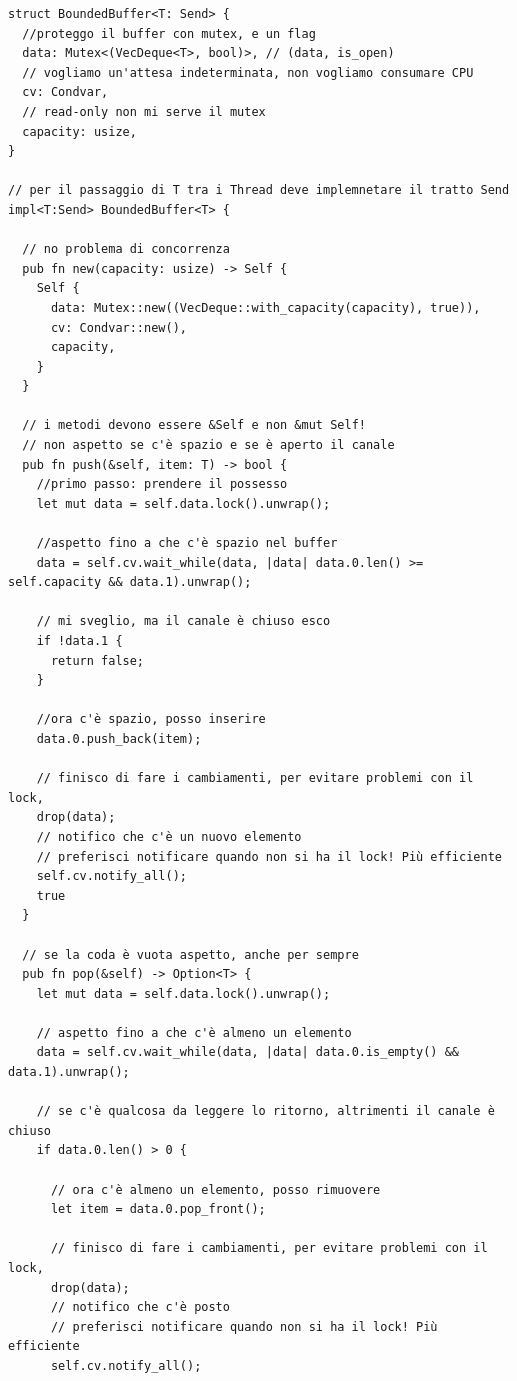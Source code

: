 \begin{verbatim}
struct BoundedBuffer<T: Send> {
  //proteggo il buffer con mutex, e un flag
  data: Mutex<(VecDeque<T>, bool)>, // (data, is_open)
  // vogliamo un'attesa indeterminata, non vogliamo consumare CPU
  cv: Condvar,
  // read-only non mi serve il mutex
  capacity: usize,
}

// per il passaggio di T tra i Thread deve implemnetare il tratto Send
impl<T:Send> BoundedBuffer<T> {

  // no problema di concorrenza
  pub fn new(capacity: usize) -> Self {
    Self {
      data: Mutex::new((VecDeque::with_capacity(capacity), true)),
      cv: Condvar::new(),
      capacity,
    }
  }

  // i metodi devono essere &Self e non &mut Self!
  // non aspetto se c'è spazio e se è aperto il canale
  pub fn push(&self, item: T) -> bool {
    //primo passo: prendere il possesso
    let mut data = self.data.lock().unwrap();

    //aspetto fino a che c'è spazio nel buffer
    data = self.cv.wait_while(data, |data| data.0.len() >= self.capacity && data.1).unwrap();

    // mi sveglio, ma il canale è chiuso esco
    if !data.1 {
      return false;
    }

    //ora c'è spazio, posso inserire
    data.0.push_back(item);

    // finisco di fare i cambiamenti, per evitare problemi con il lock,
    drop(data);
    // notifico che c'è un nuovo elemento
    // preferisci notificare quando non si ha il lock! Più efficiente
    self.cv.notify_all();
    true
  }

  // se la coda è vuota aspetto, anche per sempre
  pub fn pop(&self) -> Option<T> {
    let mut data = self.data.lock().unwrap();
  
    // aspetto fino a che c'è almeno un elemento
    data = self.cv.wait_while(data, |data| data.0.is_empty() && data.1).unwrap();

    // se c'è qualcosa da leggere lo ritorno, altrimenti il canale è chiuso
    if data.0.len() > 0 {
      
      // ora c'è almeno un elemento, posso rimuovere
      let item = data.0.pop_front();   
      
      // finisco di fare i cambiamenti, per evitare problemi con il lock,
      drop(data);
      // notifico che c'è posto
      // preferisci notificare quando non si ha il lock! Più efficiente
      self.cv.notify_all();


\end{verbatim}
